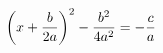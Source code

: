 \documentclass[preview]{standalone}
\begin{document}
\begin{align*}
\left( x + { b \over 2 a } \right) ^2 - { b ^2 \over 4 a ^2 } = - { c \over a }
\end{align*}
\end{document}
